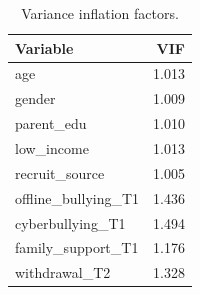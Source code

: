 \begin{table}
\caption{Variance inflation factors.}
\label{tab:vif}
\begin{tabular}{lr}
\toprule
Variable & VIF \\
\midrule
age & 1.013 \\
gender & 1.009 \\
parent_edu & 1.010 \\
low_income & 1.013 \\
recruit_source & 1.005 \\
offline_bullying_T1 & 1.436 \\
cyberbullying_T1 & 1.494 \\
family_support_T1 & 1.176 \\
withdrawal_T2 & 1.328 \\
\bottomrule
\end{tabular}
\end{table}
